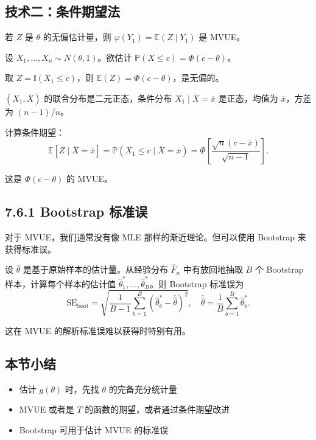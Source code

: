 \subsection{技术二：条件期望法}

若 $Z$ 是 $\theta$ 的无偏估计量，则 $\varphi(Y_1) = \mathbb{E}(Z \mid Y_1)$ 是 MVUE。

\begin{example}\label{ex:normal-cdf-mvue}
设 $X_1, \ldots, X_n \sim N(\theta, 1)$。欲估计 $\mathbb{P}(X \leq c) = \Phi(c - \theta)$。

取 $Z = \mathbb{I}(X_1 \leq c)$，则 $\mathbb{E}(Z) = \Phi(c - \theta)$，是无偏的。

$(X_1, \overline{X})$ 的联合分布是二元正态，条件分布 $X_1 \mid \overline{X} = \overline{x}$ 是正态，均值为 $\overline{x}$，方差为 $(n-1)/n$。

计算条件期望：
\[
\mathbb{E}[Z \mid \overline{X} = \overline{x}] = \mathbb{P}(X_1 \leq c \mid \overline{X} = \overline{x}) = \Phi\left[\frac{\sqrt{n}(c - \overline{x})}{\sqrt{n-1}}\right].
\]

这是 $\Phi(c - \theta)$ 的 MVUE。
\end{example}

\subsection{7.6.1 Bootstrap 标准误}

对于 MVUE，我们通常没有像 MLE 那样的渐近理论。但可以使用 Bootstrap 来获得标准误。

设 $\hat{\theta}$ 是基于原始样本的估计量。从经验分布 $\hat{F}_n$ 中有放回地抽取 $B$ 个 Bootstrap 样本，计算每个样本的估计值 $\hat{\theta}_1^*, \ldots, \hat{\theta}_B^*$。则 Bootstrap 标准误为
\[
\text{SE}_{\text{boot}} = \sqrt{\frac{1}{B-1}\sum_{b=1}^B (\hat{\theta}_b^* - \overline{\hat{\theta}})^2},\quad \overline{\hat{\theta}} = \frac{1}{B}\sum_{b=1}^B \hat{\theta}_b^*.
\]

这在 MVUE 的解析标准误难以获得时特别有用。

\subsection*{本节小结}

\begin{itemize}
\item 估计 $g(\theta)$ 时，先找 $\theta$ 的完备充分统计量
\item MVUE 或者是 $T$ 的函数的期望，或者通过条件期望改进
\item Bootstrap 可用于估计 MVUE 的标准误
\end{itemize}

